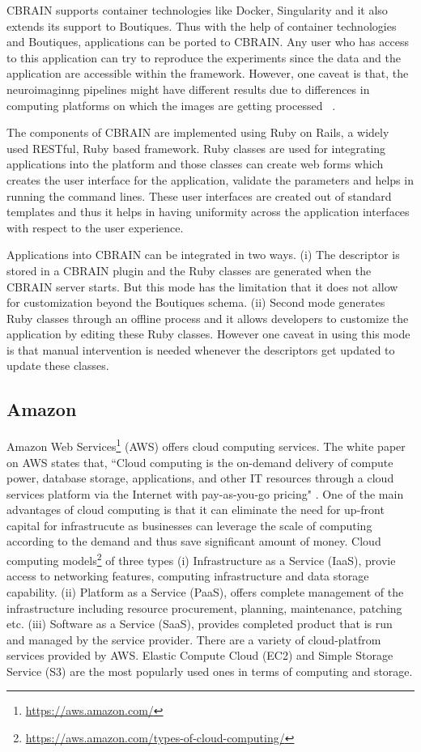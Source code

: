 CBRAIN supports container technologies like Docker, Singularity and it also extends its support to Boutiques. Thus with the help of container technologies and Boutiques, applications can be ported to CBRAIN. Any user who has access to this application can try to reproduce the experiments since the data and the application are accessible within the framework. However, one caveat is that, the neuroimaginng pipelines might have different results due to differences in computing platforms on which the images are getting processed ~\cite{10.3389/conf.fninf.2014.18.00076}.

The components of CBRAIN are implemented using Ruby on Rails, a widely used RESTful, Ruby based framework. Ruby classes are used for integrating applications into the platform and those classes can create web forms which creates the user interface for the application, validate the parameters and helps in running the command lines. These user interfaces are created out of standard templates and thus it helps in having uniformity across the application interfaces with respect to the user experience.

Applications into CBRAIN can be integrated in two ways. (i) The descriptor is stored in a CBRAIN plugin and the Ruby classes are generated when the CBRAIN server starts. But this mode has the limitation that it does not allow for customization beyond the Boutiques schema. (ii) Second mode generates Ruby classes through an offline process and it allows developers to customize the application by editing these Ruby classes. However one caveat in using this mode is that manual intervention is needed whenever the descriptors get updated to update these classes.

\subsection{Amazon}
Amazon Web Services\footnote{\url{https://aws.amazon.com/}} (AWS) offers cloud computing services. The white paper on AWS \cite{Amazon-Web-Services} states that, ``Cloud computing is the on-demand delivery of compute power, database storage, applications, and other IT resources through a cloud services platform via the Internet with pay-as-you-go pricing" \cite{Amazon-Web-Services}. One of the main advantages of cloud computing is that it can eliminate the need for up-front capital for infrastrucute as businesses can leverage the scale of computing according to the demand and thus save significant amount of money. Cloud computing models\footnote{\url{https://aws.amazon.com/types-of-cloud-computing/}} of three types (i) Infrastructure as a Service (IaaS), provie access to networking features, computing infrastructure and data storage capability. (ii) Platform as a Service (PaaS), offers complete management of the infrastructure including resource procurement, planning, maintenance, patching etc. (iii) Software as a Service (SaaS), provides completed product that is run and managed by the service provider. There are a variety of cloud-platfrom services provided by AWS. Elastic Compute Cloud (EC2) and Simple Storage Service (S3) are the most popularly used ones in terms of computing and storage.

